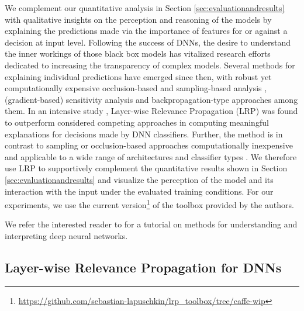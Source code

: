 \documentclass[10pt,twocolumn,letterpaper]{article}
\begin{document}
We complement our quantitative analysis
in Section \ref{sec:evaluationandresults} with qualitative insights on the perception and reasoning of the models
by explaining the predictions made via the importance of features for or against a decision at input level. Following the success of DNNs, the desire to understand the inner workings of those black box models has vitalized research efforts dedicated to increasing the transparency of complex models. Several methods for explaining individual  predictions have emerged since then, with robust yet computationally expensive occlusion-based \cite{zeiler2014visualizing} and sampling-based analysis \cite{ribeiro2016should, zintgraf2016new}, (gradient-based) sensitivity analysis \cite{gevrey2003review,baehrens2010explain,simonyan2013deep} and backpropagation-type approaches \cite{bach2015pixel,zeiler2014visualizing,MonPR17} among them. 
In an intensive study \cite{samek2016evaluating}, Layer-wise Relevance Propagation (LRP) was found to outperform considered competing approaches in computing meaningful explanations for decisions made by DNN classifiers. Further, the method is in contrast to sampling or occlusion-based approaches computationally inexpensive and applicable to a wide range of architectures and classifier types \cite{bach2015pixel,lapuschkin2016analyzing}.
We therefore use LRP to supportively complement the quantitative results shown in Section \ref{sec:evaluationandresults} and visualize the perception of the model and its interaction with the input under the evaluated training conditions. For our experiments, we use the current version\footnote{\url{https://github.com/sebastian-lapuschkin/lrp_toolbox/tree/caffe-wip}} of the toolbox \cite{lapuschkin2016lrp} provided by the authors.

We refer the interested reader to \cite{MonArXiv17} for a tutorial on methods for understanding and interpreting deep neural networks.


\subsection{Layer-wise Relevance Propagation for DNNs}
\label{sec:lrp}
\end{document}

